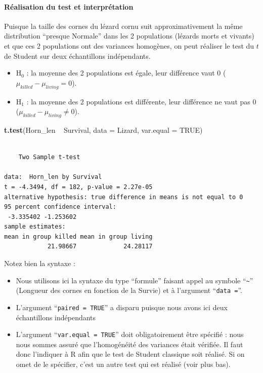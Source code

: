 \documentclass[a4paperpaper,]{article}
\newenvironment{Shaded}{\begin{snugshade}}{\end{snugshade}}
\newcommand{\DataTypeTok}[1]{\textcolor[rgb]{0.00,0.34,0.68}{#1}}
\newcommand{\KeywordTok}[1]{\textcolor[rgb]{0.12,0.11,0.11}{\textbf{#1}}}
\newcommand{\NormalTok}[1]{\textcolor[rgb]{0.12,0.11,0.11}{#1}}
\newcommand{\OperatorTok}[1]{\textcolor[rgb]{0.12,0.11,0.11}{#1}}
\newcommand{\OtherTok}[1]{\textcolor[rgb]{0.00,0.43,0.16}{#1}}
\newcommand{\StringTok}[1]{\textcolor[rgb]{0.75,0.01,0.01}{#1}}
\providecommand{\tightlist}{%
  \setlength{\itemsep}{0pt}\setlength{\parskip}{0pt}}
\let\oldparagraph\paragraph
\renewcommand{\paragraph}[1]{\oldparagraph{#1}\mbox{}}
\begin{document}
\hypertarget{ruxe9alisation-du-test-et-interpruxe9tation-2}{%
\paragraph{Réalisation du test et interprétation}\label{ruxe9alisation-du-test-et-interpruxe9tation-2}}

Puisque la taille des cornes du lézard cornu suit approximativement la même distribution ``presque Normale'' dans les 2 populations (lézards morts et vivants) et que ces 2 populations ont des variances homogènes, on peut réaliser le test du \(t\) de Student sur deux échantillons indépendants.

\begin{itemize}
\tightlist
\item
  H\(_0\) : la moyenne des 2 populations est égale, leur différence vaut 0 (\(\mu_{killed}-\mu_{living} = 0\)).
\item
  H\(_1\) : la moyenne des 2 populations est différente, leur différence ne vaut pas 0 (\(\mu_{killed}-\mu_{living} \neq 0\)).
\end{itemize}

\begin{Shaded}
\begin{Highlighting}[]
\KeywordTok{t.test}\NormalTok{(Horn_len }\OperatorTok{~}\StringTok{ }\NormalTok{Survival, }\DataTypeTok{data =}\NormalTok{ Lizard, }\DataTypeTok{var.equal =} \OtherTok{TRUE}\NormalTok{)}
\end{Highlighting}
\end{Shaded}

\begin{verbatim}

    Two Sample t-test

data:  Horn_len by Survival
t = -4.3494, df = 182, p-value = 2.27e-05
alternative hypothesis: true difference in means is not equal to 0
95 percent confidence interval:
 -3.335402 -1.253602
sample estimates:
mean in group killed mean in group living 
            21.98667             24.28117 
\end{verbatim}

Notez bien la syntaxe :

\begin{itemize}
\tightlist
\item
  Nous utilisons ici la syntaxe du type ``formule'' faisant appel au symbole ``\texttt{\textasciitilde{}}'' (Longueur des cornes en fonction de la Survie) et à l'argument ``\texttt{data\ =}''.
\item
  L'argument ``\texttt{paired\ =\ TRUE}'' a disparu puisque nous avons ici deux échantillons indépendants
\item
  L'argument ``\texttt{var.equal\ =\ TRUE}'' doit obligatoirement être spécifié : nous nous sommes assuré que l'homogénéité des variances était vérifiée. Il faut donc l'indiquer à R afin que le test de Student classique soit réalisé. Si on omet de le spécifier, c'est un autre test qui est réalisé (voir plus bas).
\end{itemize}
\end{document}

